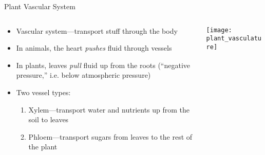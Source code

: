\documentclass[10pt]{beamer}
\begin{document}
\begin{frame}{Plant Vascular System}
  \begin{columns}
    \begin{column}{.49\textwidth}
      \begin{itemize}
      \item Vascular system---transport stuff through the body
      \item In animals, the heart \emph{pushes} fluid through vessels
      \item In plants, leaves \emph{pull} fluid up from the roots
        (``negative pressure,'' i.e. below atmospheric pressure)
      \item Two vessel types:
        \begin{enumerate}
        \item Xylem---transport water and nutrients up from the soil
          to leaves
        \item Phloem---transport sugars from leaves to the rest of the
          plant
        \end{enumerate}
      \end{itemize}
    \end{column}
    \begin{column}{.49\textwidth}
      \vfill
      \texttt{[image: plant\_vasculature]}
      \vfill
    \end{column}
  \end{columns}
\end{frame}
\end{document}
